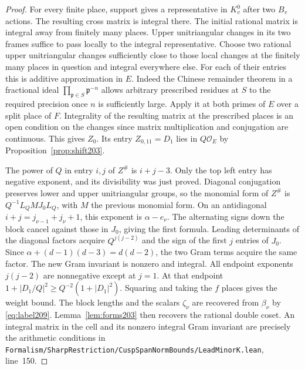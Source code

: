 \documentclass[a4paper,11pt]{article}
\theoremstyle{definition}
\theoremstyle{remark}
\newcommand{\srcloc}[2]{{\small\nolinkurl{#1.lean}}, line~#2}
\numberwithin{equation}{section}
\begin{document}
\begin{proof}
For every finite place, support gives a representative in
\(K_v^0\) after two \(B_v\) actions. The resulting cross matrix
is integral there. The initial rational matrix is integral away
from finitely many places. Upper unitriangular changes in its
two frames suffice to pass locally to the integral representative.
Choose two rational upper unitriangular changes sufficiently close
to those local changes at the finitely many places in question
and integral everywhere else. For each of their entries this is
additive approximation in \(E\). Indeed the Chinese remainder theorem in
a fractional ideal \(\prod_{\mathfrak p\in S}\mathfrak p^{-n}\)
allows arbitrary prescribed residues at \(S\) to the required
precision once \(n\) is sufficiently large. Apply it at both
primes of \(E\) over a split place of \(F\). Integrality of the
resulting matrix at the prescribed places is an open condition
on the changes since matrix multiplication and conjugation are
continuous. This gives \(Z_0\). Its entry \(Z_{0,11}=D_1\)
lies in \(Q\mathcal O_E\) by Proposition~\ref{prop:shift203}.

The power of \(Q\) in entry \(i,j\) of \(Z^\#\) is \(i+j-3\).
Only the top left entry has negative exponent, and its divisibility
was just proved. Diagonal conjugation preserves lower and upper
unitriangular groups, so the monomial form of \(Z^\#\) is
\(Q^{-1}L_Q M J_0 L_Q\), with \(M\) the previous monomial form.
On an antidiagonal \(i+j=j_{\nu-1}+j_\nu+1\), this exponent
is \(\alpha-e_\nu\). The alternating signs down the block cancel
against those in \(J_0\), giving the first formula. Leading
determinants of the diagonal factors acquire \(Q^{j(j-2)}\)
and the sign of the first \(j\) entries of \(J_0\).
Since \(\alpha+(d-1)(d-3)=d(d-2)\), the two Gram terms
acquire the same factor. The new Gram invariant is nonzero
and integral. All endpoint exponents \(j(j-2)\) are nonnegative
except at \(j=1\). At that endpoint
\(1+|D_1/Q|^2\ge Q^{-2}(1+|D_1|^2)\). Squaring and taking
the \(f\) places gives the weight bound. The block lengths and
the scalars \(\zeta_\nu\) are recovered from \(\beta_\nu\) by
\eqref{eq:label209}. Lemma~\ref{lem:forms203} then recovers the
rational double coset. An integral matrix in the cell and its
nonzero integral Gram invariant are precisely the arithmetic
conditions in
\srcloc{Formalism/SharpRestriction/CuspSpanNormBounds/LeadMinorK}{150}.
\end{proof}
\end{document}
